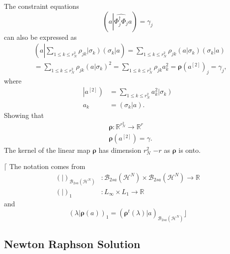\documentclass[aps,preprint]{revtex4}%
\begin{document}
The constraint equations
\begin{equation}
\left(  a\left\vert \widehat{\Phi_{j}^{\dagger}\Phi_{j}}\right.  a\right)
=\gamma_{j}%
\end{equation}
can also be expressed as
\begin{align}
&  \left(  a\left\vert \sum_{1\leq k\leq r_{N}^{2}}\rho_{jk}\left\vert
\sigma_{k}\right)  \left(  \sigma_{k}\right\vert \right.  a\right)
=\sum_{1\leq k\leq r_{N}^{2}}\rho_{jk}\left(  \left.  \overset{}{a}\right\vert
\sigma_{k}\right)  \left(  \left.  \overset{}{\sigma}_{k}\right\vert a\right)
\nonumber\\
&  =\sum_{1\leq k\leq r_{N}^{2}}\rho_{jk}\left(  \left.  \overset{}%
{a}\right\vert \sigma_{k}\right)  ^{2}=\sum_{1\leq k\leq r_{N}^{2}}\rho
_{jk}a_{k}^{2}=\mathbf{\rho}\left(  a^{\left[  2\right]  }\right)  _{j}%
=\gamma_{j},
\end{align}
where
\begin{align}
\left\vert a^{\left[  2\right]  }\right)   &  =\sum_{1\leq k\leq r_{N}^{2}%
}a_{k}^{2}\left\vert \sigma_{k}\right) \nonumber\\
a_{k}  &  =\left(  \left.  \overset{}{\sigma}_{k}\right\vert a\right)  .
\end{align}
Showing that
\begin{align}
&  \mathbf{\rho}:\mathbb{R}^{r_{N}^{2}}\rightarrow\mathbb{R}^{r}\nonumber\\
&  \mathbf{\rho}\left(  a^{\left[  2\right]  }\right)  =\gamma.
\end{align}
The kernel of the linear map $\mathbf{\rho}$ has dimension $r_{N}^{2}$ $-r$ as
$\mathbf{\rho}$ is onto.

$\lceil$ The notation comes from
\begin{align}
\left(  |\right)  _{\mathcal{B}_{2sa}\left(  \mathcal{H}^{N}\right)  }  &
:\mathcal{B}_{2sa}\left(  \mathcal{H}^{N}\right)  \times\mathcal{B}%
_{2sa}\left(  \mathcal{H}^{N}\right)  \rightarrow\mathbb{R}\nonumber\\
\left(  |\right)  _{1}  &  :L_{\infty}\times L_{1}\rightarrow\mathbb{R}%
\end{align}
and
\begin{equation}
\left(  \lambda|\mathbf{\rho}\left(  a\right)  \right)  _{1}=\left(
\mathbf{\rho}^{t}\left(  \lambda\right)  |a\right)  _{\mathcal{B}_{2sa}\left(
\mathcal{H}^{N}\right)  }\rfloor
\end{equation}


\subsection{Newton Raphson Solution}
\end{document}

